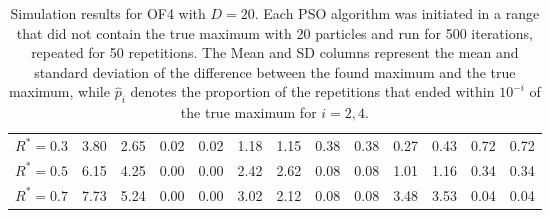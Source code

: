 \documentclass[12pt]{article}
\begin{document}
\begin{table}[ht]
{\begin{tabular}{r|rrrr|rrrr|rrrr}
  $R^* = 0.3$ & 3.80 & 2.65 & 0.02 & 0.02 & 1.18 & 1.15 & 0.38 & 0.38 & 0.27 & 0.43 & 0.72 & 0.72 \\ 
  $R^* = 0.5$ & 6.15 & 4.25 & 0.00 & 0.00 & 2.42 & 2.62 & 0.08 & 0.08 & 1.01 & 1.16 & 0.34 & 0.34 \\ 
  $R^* = 0.7$ & 7.73 & 5.24 & 0.00 & 0.00 & 3.02 & 2.12 & 0.08 & 0.08 & 3.48 & 3.53 & 0.04 & 0.04 \\ 
   \hline
\end{tabular}
}
\caption{Simulation results for OF4 with $D=20$. Each PSO algorithm was initiated in a range that did not contain the true maximum with 20 particles and run for 500 iterations, repeated for 50 repetitions. The Mean and SD columns represent the mean and standard deviation of the difference between the found maximum and the true maximum, while $\widehat{p}_i$ denotes the proportion of the repetitions that ended within $10^{-i}$ of the true maximum for $i=2,4$.}
\label{tab:psosim4}
\end{table}
\end{document}
